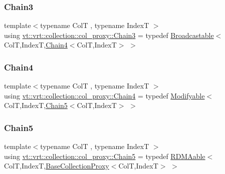 \subsubsection{\texorpdfstring{Chain3}{Chain3}}
{\footnotesize\ttfamily template$<$typename ColT , typename IndexT $>$ \\
using \hyperlink{namespacevt_1_1vrt_1_1collection_1_1col__proxy_aa83ea97afbf21f975d02b933af0ee42c}{vt\+::vrt\+::collection\+::col\+\_\+proxy\+::\+Chain3} = typedef \hyperlink{structvt_1_1vrt_1_1collection_1_1_broadcastable}{Broadcastable}$<$ColT,IndexT,\hyperlink{namespacevt_1_1vrt_1_1collection_1_1col__proxy_a41979c822dde46dfe2e2b9329f749a51}{Chain4}$<$ColT,IndexT$>$ $>$}

\mbox{\label{namespacevt_1_1vrt_1_1collection_1_1col__proxy_a41979c822dde46dfe2e2b9329f749a51}} 
\subsubsection{\texorpdfstring{Chain4}{Chain4}}
{\footnotesize\ttfamily template$<$typename ColT , typename IndexT $>$ \\
using \hyperlink{namespacevt_1_1vrt_1_1collection_1_1col__proxy_a41979c822dde46dfe2e2b9329f749a51}{vt\+::vrt\+::collection\+::col\+\_\+proxy\+::\+Chain4} = typedef \hyperlink{structvt_1_1vrt_1_1collection_1_1_modifyable}{Modifyable}$<$ColT,IndexT,\hyperlink{namespacevt_1_1vrt_1_1collection_1_1col__proxy_a96685f5884d57269c5c7dfe14dcc361b}{Chain5}$<$ColT,IndexT$>$ $>$}

\mbox{\label{namespacevt_1_1vrt_1_1collection_1_1col__proxy_a96685f5884d57269c5c7dfe14dcc361b}} 
\subsubsection{\texorpdfstring{Chain5}{Chain5}}
{\footnotesize\ttfamily template$<$typename ColT , typename IndexT $>$ \\
using \hyperlink{namespacevt_1_1vrt_1_1collection_1_1col__proxy_a96685f5884d57269c5c7dfe14dcc361b}{vt\+::vrt\+::collection\+::col\+\_\+proxy\+::\+Chain5} = typedef \hyperlink{structvt_1_1vrt_1_1collection_1_1_r_d_m_aable}{R\+D\+M\+Aable}$<$ColT,IndexT,\hyperlink{structvt_1_1vrt_1_1collection_1_1_base_collection_proxy}{Base\+Collection\+Proxy}$<$ColT,IndexT$>$ $>$}

